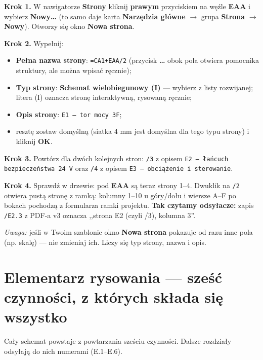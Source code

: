 \documentclass[11pt,a4paper]{article}
\newcommand{\ui}[1]{\textbf{#1}}                    %
\newcommand{\krok}[1]{\par\medskip\noindent\textbf{\color{granat}Krok #1.}\space}
\begin{document}
\krok{1} W nawigatorze \ui{Strony} kliknij \textbf{prawym} przyciskiem na węźle \ui{EAA}
i wybierz \ui{Nowy\ldots} (to samo daje karta \ui{Narzędzia główne} $\to$ grupa \ui{Strona}
$\to$ \ui{Nowy}). Otworzy się okno \ui{Nowa strona}.

\krok{2} Wypełnij:
\begin{itemize}
\item \ui{Pełna nazwa strony}: \texttt{=CA1+EAA/2} (przycisk \ui{\ldots} obok pola otwiera
pomocnika struktury, ale można wpisać ręcznie);
\item \ui{Typ strony}: \textbf{Schemat wielobiegunowy (I)} --- wybierz z listy rozwijanej;
litera (I) oznacza stronę interaktywną, rysowaną ręcznie;
\item \ui{Opis strony}: \texttt{E1 --- tor mocy 3F};
\item resztę zostaw domyślną (siatka 4 mm jest domyślna dla tego typu strony) i kliknij \ui{OK}.
\end{itemize}

\krok{3} Powtórz dla dwóch kolejnych stron:
\texttt{/3} z opisem \texttt{E2 --- łańcuch bezpieczeństwa 24 V} oraz
\texttt{/4} z opisem \texttt{E3 --- obciążenie i sterowanie}.

\krok{4} Sprawdź w drzewie: pod \ui{EAA} są teraz strony 1--4. Dwuklik na \texttt{/2} otwiera
pustą stronę z ramką: kolumny 1--10 u góry/dołu i wiersze A--F po bokach pochodzą z formularza
ramki projektu. \textbf{Tak czytamy odsyłacze:} zapis \texttt{/E2.3} z PDF-a v3 oznacza
,,strona E2 (czyli /3), kolumna 3''.

\emph{Uwaga:} jeśli w Twoim szablonie okno \ui{Nowa strona} pokazuje od razu inne pola
(np. skalę) --- nie zmieniaj ich. Liczy się typ strony, nazwa i opis.

\section{Elementarz rysowania --- sześć czynności, z których składa się wszystko}
\label{sec:elementarz}

Cały schemat powstaje z powtarzania sześciu czynności. Dalsze rozdziały odsyłają do nich
numerami (E.1--E.6).
\end{document}
